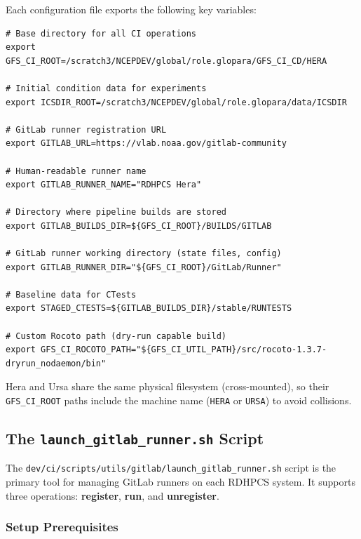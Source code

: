 \documentclass[11pt,letterpaper,twoside]{article}
\begin{document}
Each configuration file exports the following key variables:

\begin{lstlisting}[style=bash, caption={Platform configuration variables (Hera example)}, label=lst:platform-vars, basicstyle=\ttfamily\footnotesize]
# Base directory for all CI operations
export GFS_CI_ROOT=/scratch3/NCEPDEV/global/role.glopara/GFS_CI_CD/HERA

# Initial condition data for experiments
export ICSDIR_ROOT=/scratch3/NCEPDEV/global/role.glopara/data/ICSDIR

# GitLab runner registration URL
export GITLAB_URL=https://vlab.noaa.gov/gitlab-community

# Human-readable runner name
export GITLAB_RUNNER_NAME="RDHPCS Hera"

# Directory where pipeline builds are stored
export GITLAB_BUILDS_DIR=${GFS_CI_ROOT}/BUILDS/GITLAB

# GitLab runner working directory (state files, config)
export GITLAB_RUNNER_DIR="${GFS_CI_ROOT}/GitLab/Runner"

# Baseline data for CTests
export STAGED_CTESTS=${GITLAB_BUILDS_DIR}/stable/RUNTESTS

# Custom Rocoto path (dry-run capable build)
export GFS_CI_ROCOTO_PATH="${GFS_CI_UTIL_PATH}/src/rocoto-1.3.7-dryrun_nodaemon/bin"
\end{lstlisting}

\begin{notebox}
Hera and Ursa share the same physical filesystem (cross-mounted), so their
\texttt{GFS\_CI\_ROOT} paths include the machine name (\texttt{HERA} or
\texttt{URSA}) to avoid collisions.
\end{notebox}

\subsection{The \texttt{launch\_gitlab\_runner.sh} Script}
\label{sec:launch-script}

The \texttt{dev/ci/scripts/utils/gitlab/launch\_gitlab\_runner.sh} script is the
primary tool for managing GitLab runners on each RDHPCS system. It supports
three operations: \textbf{register}, \textbf{run}, and \textbf{unregister}.

\subsubsection{Setup Prerequisites}
\end{document}

